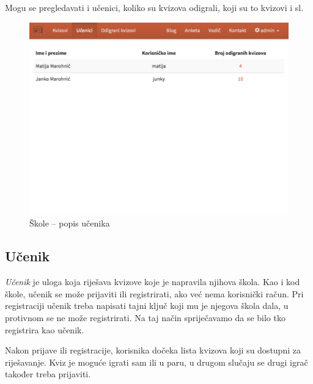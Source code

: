 \documentclass{scrreprt}
\begin{document}
Mogu se pregledavati i učenici, koliko su kvizova odigrali, koji su to kvizovi i
sl.

\begin{figure}[H]
  \includegraphics[width=\textwidth, clip=true, trim=0 15cm 0 0, fbox]{school/students}
  \caption{Škole -- popis učenika}
\end{figure}

\subsection{Učenik}


\emph{Učenik} je uloga koja riješava kvizove koje je napravila njihova škola.
Kao i kod škole, učenik se može prijaviti ili registrirati, ako već nema
korisnički račun. Pri registraciji učenik treba napisati tajni ključ koji mu je
njegova škola dala, u protivnom se ne može registrirati. Na taj način
spriječavamo da se bilo tko registrira kao učenik.

Nakon prijave ili registracije, korisnika dočeka lista kvizova koji su dostupni
za riješavanje. Kviz je moguće igrati sam ili u paru, u drugom slučaju se drugi
igrač također treba prijaviti.
\end{document}
